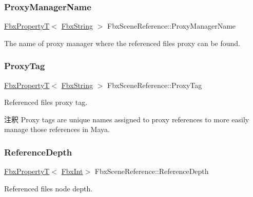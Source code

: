 \subsubsection{\texorpdfstring{Proxy\+Manager\+Name}{ProxyManagerName}}
{\footnotesize\ttfamily \hyperlink{class_fbx_property_t}{Fbx\+PropertyT}$<$ \hyperlink{class_fbx_string}{Fbx\+String} $>$ Fbx\+Scene\+Reference\+::\+Proxy\+Manager\+Name}



The name of proxy manager where the referenced file\textquotesingle{}s proxy can be found. 

\mbox{\label{class_fbx_scene_reference_a0ced8e6b90ec7d085b82c194188d89bb}} 
\subsubsection{\texorpdfstring{Proxy\+Tag}{ProxyTag}}
{\footnotesize\ttfamily \hyperlink{class_fbx_property_t}{Fbx\+PropertyT}$<$ \hyperlink{class_fbx_string}{Fbx\+String} $>$ Fbx\+Scene\+Reference\+::\+Proxy\+Tag}

Referenced file\textquotesingle{}s proxy tag. \begin{DoxyRemark}{注釈}
Proxy tags are unique names assigned to proxy references to more easily manage those references in Maya. 
\end{DoxyRemark}
\mbox{\label{class_fbx_scene_reference_a66ad8666d23493dc9e20cb7fa411963b}} 
\subsubsection{\texorpdfstring{Reference\+Depth}{ReferenceDepth}}
{\footnotesize\ttfamily \hyperlink{class_fbx_property_t}{Fbx\+PropertyT}$<$ \hyperlink{fbxtypes_8h_a088fa96de3b0b3ea69f0f6afef525dfb}{Fbx\+Int}$>$ Fbx\+Scene\+Reference\+::\+Reference\+Depth}



Referenced file\textquotesingle{}s node depth. 

\mbox{\label{class_fbx_scene_reference_a782b9db13deb9ab4b1f5b1b48c4dbb0a}} 
